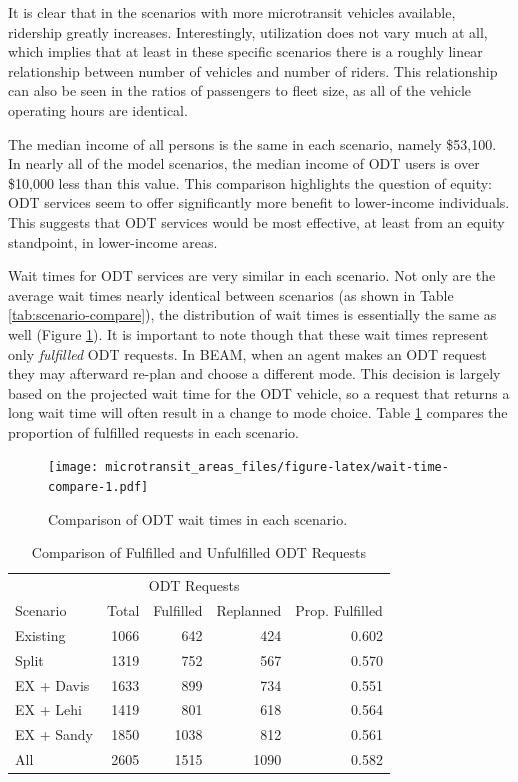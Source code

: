 \documentclass[
]{report}
\begin{document}
It is clear that in the scenarios with more microtransit vehicles available, ridership greatly increases. Interestingly, utilization does not vary much at all, which implies that at least in these specific scenarios there is a roughly linear relationship between number of vehicles and number of riders. This relationship can also be seen in the ratios of passengers to fleet size, as all of the vehicle operating hours are identical.

The median income of all persons is the same in each scenario, namely \$53,100. In nearly all of the model scenarios, the median income of ODT users is over \$10,000 less than this value. This comparison highlights the question of equity: ODT services seem to offer significantly more benefit to lower-income individuals. This suggests that ODT services would be most effective, at least from an equity standpoint, in lower-income areas.

Wait times for ODT services are very similar in each scenario. Not only are the average wait times nearly identical between scenarios (as shown in Table \ref{tab:scenario-compare}), the distribution of wait times is essentially the same as well (Figure \ref{fig:wait-time-compare}). It is important to note though that these wait times represent only \emph{fulfilled} ODT requests. In BEAM, when an agent makes an ODT request they may afterward re-plan and choose a different mode. This decision is largely based on the projected wait time for the ODT vehicle, so a request that returns a long wait time will often result in a change to mode choice. Table \ref{tab:odt-fulfillment} compares the proportion of fulfilled requests in each scenario.

\begin{figure}
\centering
\texttt{[image: microtransit\_areas\_files/figure-latex/wait-time-compare-1.pdf]}
\caption{\label{fig:wait-time-compare}Comparison of ODT wait times in each scenario.}
\end{figure}

\begin{table}

\caption{\label{tab:odt-fulfillment}Comparison of Fulfilled and Unfulfilled ODT Requests}
\centering
\begin{tabular}[t]{lrrrr}
\toprule
\multicolumn{1}{c}{} & \multicolumn{3}{c}{ODT Requests} & \multicolumn{1}{c}{} \\
\cmidrule(l{3pt}r{3pt}){2-4}
Scenario & Total & Fulfilled & Replanned & Prop. Fulfilled\\
\midrule
Existing & 1066 & 642 & 424 & 0.602\\
Split & 1319 & 752 & 567 & 0.570\\
EX + Davis & 1633 & 899 & 734 & 0.551\\
EX + Lehi & 1419 & 801 & 618 & 0.564\\
EX + Sandy & 1850 & 1038 & 812 & 0.561\\
\addlinespace
All & 2605 & 1515 & 1090 & 0.582\\
\bottomrule
\end{tabular}
\end{table}
\end{document}
